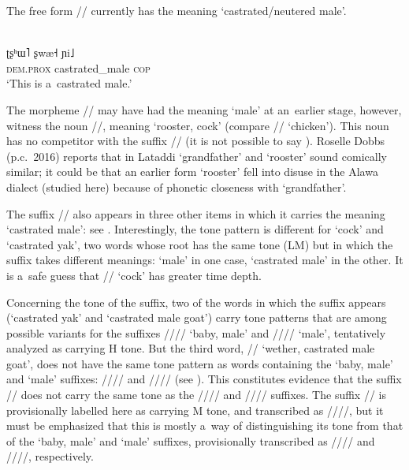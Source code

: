 	The free form // currently has the meaning ‘castrated/neutered male’.
	
	\begin{exe}
		\ex
		\label{ex:ismale2}
		\\
		\gll ʈʂʰɯ˥	ʂwæ˧	ɲi˩\\
		\textsc{dem.prox}		castrated\_male	\textsc{cop}\\
		\glt ‘This is a~castrated male.’
	\end{exe}
	
	
	The morpheme // may have had the
	meaning ‘male’ at an~earlier stage, however, witness the noun //, meaning ‘rooster, cock’ (compare // ‘chicken’). This noun has no competitor with the suffix // (it is not possible to say ). Roselle Dobbs (p.c.\ 2016) reports that in Lataddi  ‘grandfather’ and ‘rooster’ sound comically similar; it could be that an earlier form  ‘rooster’ fell into disuse in the Alawa dialect (studied here) because of phonetic closeness with ‘grandfather’. 
	
	The suffix // also appears in three other items in which it carries the meaning ‘castrated male’: see . Interestingly, the
	tone pattern is different for ‘cock’ and ‘castrated yak’, two words whose root has the same tone
	(LM) but in which the suffix takes different meanings: ‘male’ in one case, ‘castrated male’ in
	the other. It is a~safe guess that // ‘cock’ has greater time depth.
	
	Concerning the tone of the suffix, two of the words in which the suffix appears (‘castrated yak’ and ‘castrated male goat’) carry tone patterns that are among possible variants for the suffixes \mbox{////} ‘baby, male’ and \mbox{////} ‘male’, tentatively analyzed as carrying H tone. But the third word, // ‘wether, castrated male goat’, does not have the same tone pattern as words containing the ‘baby, male’ and ‘male’ suffixes: //{\kern2pt}// and //{\kern2pt}// (see ). This constitutes evidence that the suffix // does not carry the same tone as the \mbox{////} and \mbox{////} suffixes.  The suffix // is provisionally labelled here as carrying M tone, and transcribed as \mbox{////}, but it must be emphasized that this is mostly a~way of distinguishing its tone from that of the ‘baby, male’ and ‘male’ suffixes, provisionally transcribed as //// and ////, respectively.
	
